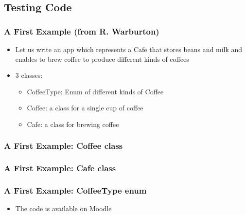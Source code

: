 \documentclass{beamer}
\begin{document}
\subsection{Testing Code}
\begin{frame}
\frametitle{A First Example (from R. Warburton)}
\begin{itemize}
\item Let us write an app which represents a Cafe that stores beans
  and milk and enables to brew coffee to produce different kinds of
  coffees
\item 3 classes:
  \begin{itemize}
  \item CoffeeType: Enum of different kinds of Coffee
  \item Coffee: a class for a single cup of coffee
  \item Cafe: a class for brewing coffee
  \end{itemize}    
\end{itemize}
\end{frame}

\begin{frame}
\frametitle{A First Example: Coffee class}
\end{frame}

\begin{frame}
\frametitle{A First Example: Cafe class}
\end{frame}

\begin{frame}
\frametitle{A First Example: CoffeeType enum}
  \begin{itemize}
  \vspace{5cm}
\item[] The code is available on Moodle
  \end{itemize}
\end{frame}
\end{document}
